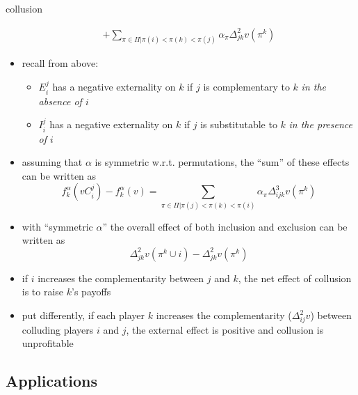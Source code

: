 \documentclass[11pt,english]{beamer}
\begin{document}
\begin{frame}[allowframebreaks]{collusion}
\begin{itemize}
\begin{eqnarray*}
        + \sum_{\pi \in
          \Pi | \pi(i)<\pi(k)<\pi(j)} \alpha_\pi \Delta^2_{jk} v(\pi^k)
      \end{eqnarray*}
   \item recall from above:
     \begin{itemize}
     \item $E_i^j$ has a negative externality on $k$ if $j$ is
       complementary to $k$ \emph{in the absence of $i$}
     \item $I_i^j$ has a negative externality on $k$ if $j$ is
       substitutable to $k$ \emph{in the presence of $i$}
     \end{itemize}
   \item assuming that $\alpha$ is symmetric w.r.t. permutations,
     the ``sum'' of these effects can be written as
     \begin{equation*}
        f_k^\alpha(vC_i^j)-f_k^\alpha(v) = \sum_{\pi \in
          \Pi| \pi(j)<\pi(k)<\pi(i)} \alpha_\pi \Delta^3_{ijk} v(\pi^k)
     \end{equation*}
   \item with ``symmetric $\alpha$'' the overall effect of both inclusion
     and exclusion can be written as
     \begin{equation*}
       \Delta^2_{jk} v(\pi^k \cup i)-\Delta^2_{jk} v(\pi^k)
     \end{equation*}
   \item if $i$ increases the complementarity between $j$ and $k$, the
     net effect of collusion is to raise $k$'s payoffs
   \item put differently, if each player $k$ increases the complementarity
     ($\Delta_{ij}^2v$) between colluding players $i$ and $j$, the
     external effect is positive and collusion is unprofitable
  \end{itemize}
\end{frame}


\subsection{Applications}
\end{document}
